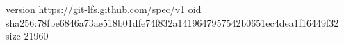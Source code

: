 version https://git-lfs.github.com/spec/v1
oid sha256:78fbe6846a73ae518b01dfe74f832a1419647957542b0651ec4dea1f16449f32
size 21960
